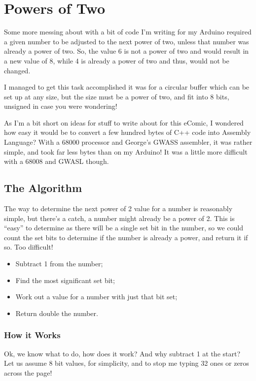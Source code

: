 \chapter{Powers of Two}

Some more messing about with a bit of code I'm writing for my Arduino
required a given number to be adjusted to the next power of two, unless
that number was already a power of two. So, the value 6 is not a power
of two and would result in a new value of 8, while 4 is already a
power of two and thus, would not be changed.

I managed to get this task accomplished \textendash{} it was for a
circular buffer which can be set up at any size, but the size must
be a power of two, and fit into 8 bits, unsigned \textendash{} in
case you were wondering!

As I'm a bit short on ideas for stuff to write about for this eComic,
I wondered how easy it would be to convert a few hundred bytes of
C++ code into Assembly Language? With a 68000 processor and George's
GWASS assembler, it was rather simple, and took far less bytes than
on my Arduino! It was a little more difficult with a 68008 and GWASL
though.

\section{The Algorithm}

The way to determine the next power of 2 value for a number is reasonably
simple, but there's a catch, a number might already be a power of
2. This is ``easy'' to determine as there will be a single set bit
in the number, so we could count the set bits to determine if the
number is already a power, and return it if so. Too difficult! 
\begin{itemize}
\item Subtract 1 from the number;
\item Find the most significant set bit;
\item Work out a value for a number with just that bit set;
\item Return double the number.
\end{itemize}

\subsection{How it Works}

Ok, we know what to do, how does it work? And why subtract 1 at the
start? Let us assume 8 bit values, for simplicity, and to stop me
typing 32 ones or zeros across the page!

